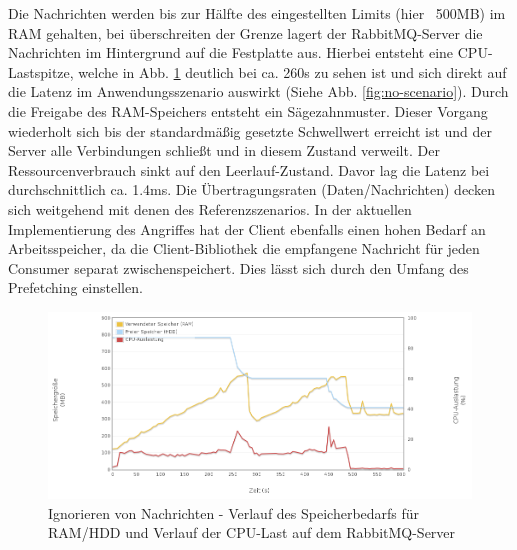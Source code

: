 \documentclass[	a4paper,
			11pt,
			oneside,
			parskip]{scrartcl}
\begin{document}
	
	\clearpage
		{%
		  \newline
		  \newline
		  \newline
		}{%
		 Die Nachrichten werden bis zur Hälfte des eingestellten Limits (hier ~500MB) im RAM gehalten, bei überschreiten der Grenze lagert der RabbitMQ-Server die Nachrichten im Hintergrund auf die Festplatte aus.
		 Hierbei entsteht eine CPU-Lastspitze, welche in Abb. \ref{fig:no-server1} deutlich bei ca. 260s zu sehen ist und sich direkt auf die Latenz im Anwendungsszenario auswirkt (Siehe Abb. \ref{fig:no-scenario}). Durch die Freigabe des RAM-Speichers entsteht ein Sägezahnmuster. Dieser Vorgang wiederholt sich bis der standardmäßig gesetzte Schwellwert erreicht ist und der Server alle Verbindungen schließt und in diesem Zustand verweilt. Der Ressourcenverbrauch sinkt auf den Leerlauf-Zustand. Davor lag die Latenz bei durchschnittlich ca. 1.4ms. Die Übertragungsraten (Daten/Nachrichten) decken sich weitgehend mit denen des Referenzszenarios.
		}{%
		 In der aktuellen Implementierung des Angriffes hat der Client ebenfalls einen hohen Bedarf an Arbeitsspeicher, da die Client-Bibliothek die empfangene Nachricht für jeden Consumer
		 separat zwischenspeichert. Dies lässt sich durch den Umfang des Prefetching einstellen.
		}
		
		\begin{figure}[!htb]
			\centering
			\includegraphics[width=\textwidth]{img/no/no_server1.png}
			\caption{Ignorieren von Nachrichten - Verlauf des Speicherbedarfs für RAM/HDD und Verlauf der CPU-Last auf dem RabbitMQ-Server}
			\label{fig:no-server1}
		\end{figure}
		
\end{document}
